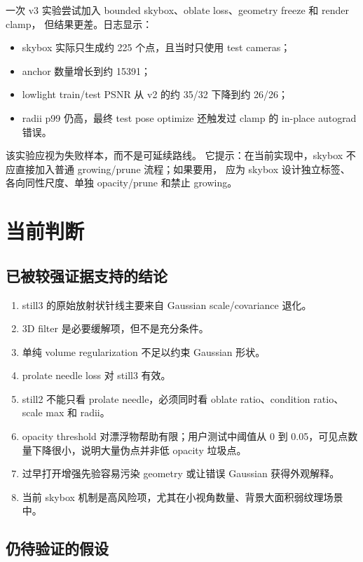 \documentclass[11pt,a4paper]{article}
\begin{document}
一次 v3 实验尝试加入 bounded skybox、oblate loss、geometry freeze 和 render clamp，
但结果更差。日志显示：
\begin{itemize}[leftmargin=1.5em]
  \item skybox 实际只生成约 225 个点，且当时只使用 test cameras；
  \item anchor 数量增长到约 15391；
  \item lowlight train/test PSNR 从 v2 的约 35/32 下降到约 26/26；
  \item radii p99 仍高，最终 test pose optimize 还触发过 clamp 的 in-place autograd 错误。
\end{itemize}
该实验应视为失败样本，而不是可延续路线。
它提示：在当前实现中，skybox 不应直接加入普通 growing/prune 流程；如果要用，
应为 skybox 设计独立标签、各向同性尺度、单独 opacity/prune 和禁止 growing。

\section{当前判断}

\subsection{已被较强证据支持的结论}

\begin{enumerate}[leftmargin=1.5em]
  \item still3 的原始放射状针线主要来自 Gaussian scale/covariance 退化。
  \item 3D filter 是必要缓解项，但不是充分条件。
  \item 单纯 volume regularization 不足以约束 Gaussian 形状。
  \item prolate needle loss 对 still3 有效。
  \item still2 不能只看 prolate needle，必须同时看 oblate ratio、condition ratio、scale max 和 radii。
  \item opacity threshold 对漂浮物帮助有限；用户测试中阈值从 0 到 0.05，可见点数量下降很小，说明大量伪点并非低 opacity 垃圾点。
  \item 过早打开增强先验容易污染 geometry 或让错误 Gaussian 获得外观解释。
  \item 当前 skybox 机制是高风险项，尤其在小视角数量、背景大面积弱纹理场景中。
\end{enumerate}

\subsection{仍待验证的假设}
\end{document}
